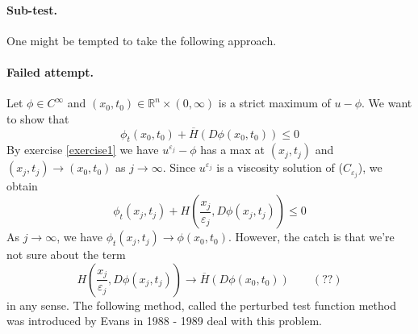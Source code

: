 \documentclass[12pt, oneside]{amsart}  	%
\begin{document}
\paragraph{\textbf{Sub-test.}} One might be tempted to take the following approach. 

\paragraph{\textbf{Failed attempt.}}
Let $\phi\in C^\infty$ and $(x_0, t_0)\in \mathbb{R}^n\times (0,\infty)$ is a strict maximum of $u-\phi$. We want to show that
\begin{equation*}
\phi_t(x_0,t_0) + \overline{H}(D\phi(x_0,t_0)) \leq 0
\end{equation*}
By exercise \ref{exercise1} we have $u^{\varepsilon_j} - \phi$ has a max at $(x_j,t_j)$ and $(x_j,t_j)\longrightarrow (x_0,t_0)$ as $j\longrightarrow \infty$. Since $u^{\varepsilon_j}$ is a viscosity solution of ($C_{\varepsilon_j}$), we obtain
\begin{equation*}
\phi_t(x_j,t_j) + H\left(\frac{x_j}{\varepsilon_j}, D\phi(x_j,t_j)\right) \leq 0
\end{equation*}
As $j\longrightarrow \infty$, we have $\phi_t(x_j,t_j)\longrightarrow \phi(x_0,t_0)$. However, the catch is that we're not sure about the term 
\begin{equation*}
H\left(\frac{x_j}{\varepsilon_j}, D\phi(x_j,t_j)\right) \longrightarrow \overline{H}(D\phi(x_0,t_0)) \qquad (??)
\end{equation*}
in any sense. The following method, called the perturbed test function method was introduced by Evans in 1988 - 1989 deal with this problem.
\end{document}
